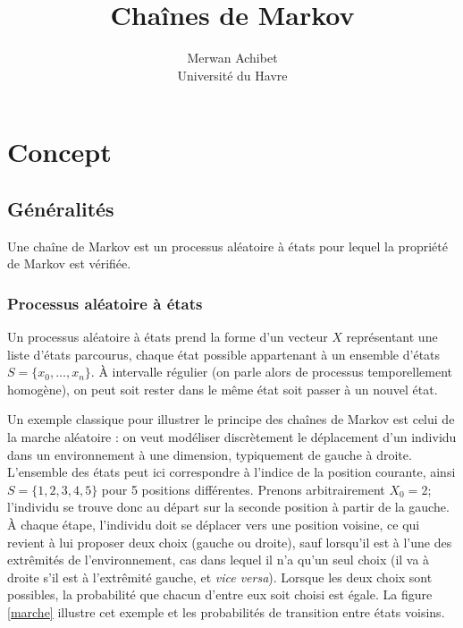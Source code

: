 \documentclass[12pt]{article}
\title{Chaînes de Markov}
\author{Merwan Achibet\\Université du Havre}
\date{}
\begin{document}
\maketitle

\section{Concept}

\subsection{Généralités}

Une chaîne de Markov est un processus aléatoire à états pour lequel la
propriété de Markov est vérifiée.

\subsubsection{Processus aléatoire à états}

Un processus aléatoire à états prend la forme d'un vecteur $X$
représentant une liste d'états parcourus, chaque état possible
appartenant à un ensemble d'états $S = \{x_0, \dots, x_n \}$. \`A
intervalle régulier (on parle alors de processus temporellement
homogène), on peut soit rester dans le même état soit passer à un
nouvel état.

Un exemple classique pour illustrer le principe des chaînes de Markov
est celui de la marche aléatoire \cite{ocone} : on veut modéliser
discrètement le déplacement d'un individu dans un environnement à une
dimension, typiquement de gauche à droite. L'ensemble des états peut
ici correspondre à l'indice de la position courante, ainsi $S = \{1,
2, 3, 4, 5\}$ pour 5 positions différentes. Prenons arbitrairement
$X_0 = 2$; l'individu se trouve donc au départ sur la seconde position
à partir de la gauche. \`A chaque étape, l'individu doit se déplacer
vers une position voisine, ce qui revient à lui proposer deux choix
(gauche ou droite), sauf lorsqu'il est à l'une des extrêmités de
l'environnement, cas dans lequel il n'a qu'un seul choix (il va à
droite s'il est à l'extrêmité gauche, et \textit{vice versa}). Lorsque
les deux choix sont possibles, la probabilité que chacun d'entre eux
soit choisi est égale. La figure \ref{marche} illustre cet exemple et
les probabilités de transition entre états voisins.
\end{document}
